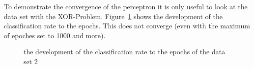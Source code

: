 \documentclass[subfigure,epsfig,fleqn,float,ausarbeitung]{scrartcl}
\begin{document}
To demonstrate the convergence of the perceptron it is only useful to look at the data set with the XOR-Problem. Figure~\ref{fig:epochs} shows the development of the classification rate to the epochs. This does not converge (even with the maximum of epoches set to 1000 and more). 

\begin{figure}
	\centering
	\setlength\figureheight{6cm} 
	\setlength\figurewidth{8cm}
	
	\caption{the development of the classification rate to the epochs of the data set 2}
	\label{fig:epochs}
\end{figure}
\end{document}

